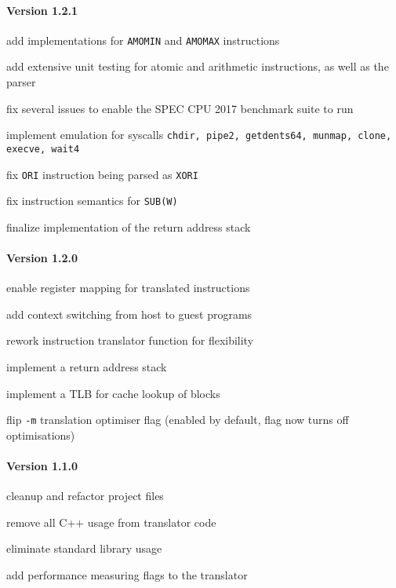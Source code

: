 \paragraph{Version 1.2.1}
\begin{itemize*}
 	\item add implementations for \texttt{AMOMIN} and \texttt{AMOMAX} instructions
 	\item add extensive unit testing for atomic and arithmetic instructions, as well as the parser
 	\item fix several issues to enable the SPEC CPU 2017 benchmark suite to run
 	\item implement emulation for syscalls \texttt{chdir, pipe2, getdents64, munmap, clone, execve, wait4}
 	\item fix \texttt{ORI} instruction being parsed as \texttt{XORI}
 	\item fix instruction semantics for \texttt{SUB(W)}
 	\item finalize implementation of the return address stack
\end{itemize*}


\paragraph{Version 1.2.0}
\begin{itemize*}
 	\item enable register mapping for translated instructions
 	\item add context switching from host to guest programs
 	\item rework instruction translator function for flexibility
 	\item implement a return address stack
 	\item implement a TLB for cache lookup of blocks
 	\item flip \texttt{-m} translation optimiser flag (enabled by default, flag now turns off optimisations)
\end{itemize*}


\paragraph{Version 1.1.0}
\begin{itemize*}
 	\item cleanup and refactor project files
 	\item remove all C++ usage from translator code
 	\item eliminate standard library usage
 	\item add performance measuring flags to the translator
\end{itemize*}



